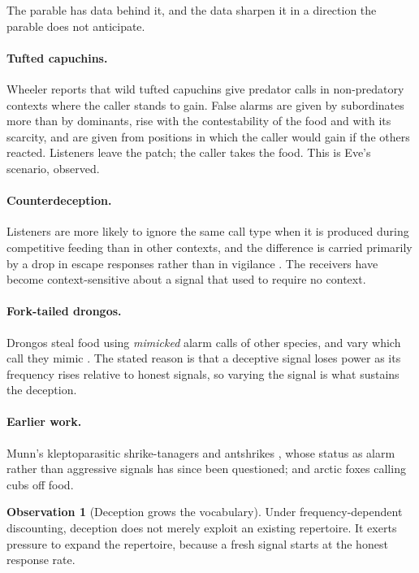 \documentclass[11pt]{article}
\theoremstyle{plain}
\theoremstyle{definition}
\newtheorem{observation}[theorem]{Observation}
\begin{document}
The parable has data behind it, and the data sharpen it in a direction the parable does not anticipate.

\paragraph{Tufted capuchins.} Wheeler \cite{wheeler2009} reports that wild tufted capuchins give
predator calls in non-predatory contexts where the caller stands to gain. False alarms are given by
subordinates more than by dominants, rise with the contestability of the food and with its scarcity,
and are given from positions in which the caller would gain if the others reacted. Listeners leave the
patch; the caller takes the food. This is Eve's scenario, observed.

\paragraph{Counterdeception.} Listeners are more likely to ignore the same call type when it is produced
during competitive feeding than in other contexts, and the difference is carried primarily by a drop in
escape responses rather than in vigilance \cite{wheeler2010,wheeler2013}. The receivers have become
context-sensitive about a signal that used to require no context.

\paragraph{Fork-tailed drongos.} Drongos steal food using \emph{mimicked} alarm calls of other species,
and vary which call they mimic \cite{flower2011,flower2014}. The stated reason is that a deceptive
signal loses power as its frequency rises relative to honest signals, so varying the signal is what
sustains the deception.

\paragraph{Earlier work.} Munn's kleptoparasitic shrike-tanagers and antshrikes \cite{munn1986}, whose
status as alarm rather than aggressive signals has since been questioned; and arctic foxes calling cubs
off food.

\begin{observation}[Deception grows the vocabulary]
\label{obs:vocab}
Under frequency-dependent discounting, deception does not merely exploit an existing repertoire. It
exerts pressure to expand the repertoire, because a fresh signal starts at the honest response rate.
\end{observation}
\end{document}
